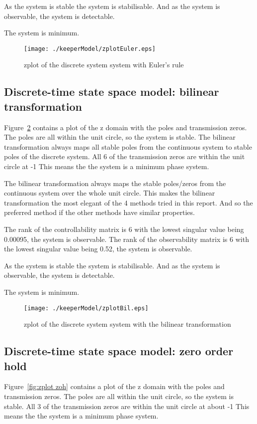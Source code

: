 As the system is stable  the system is stabilisable. And as the system is observable, the system is detectable.

The system is minimum.


\begin{figure}[H]
	\centering
	\texttt{[image: ./keeperModel/zplotEuler.eps]}
	\caption{zplot of the discrete system system with Euler's rule}
	\label{fig:zplot euler}
\end{figure}

\subsection{Discrete-time state space model: bilinear transformation}
Figure~\ref{fig:zplot bil} contains a plot of the z domain with the poles and transmission zeros. The poles are all within the unit circle, so the system is stable. The bilinear  transformation always maps all stable poles from the continuous system to stable poles of the discrete system. All 6 of the transmission zeros are within the unit circle at -1 This means the the system is a minimum phase system.

The bilinear transformation always maps the stable poles/zeros from the continuous system over the whole unit circle. This makes the bilinear transformation the most elegant of the 4 methods tried in this report. And so the preferred method if the other methods have similar properties.

The rank of the controllability matrix is 6 with the lowest singular value being 0.00095, the system is observable. The rank of the observability matrix is 6 with the lowest singular value being 0.52, the system is observable.

As the system is stable  the system is stabilisable. And as the system is observable, the system is detectable.

The system is minimum.

\begin{figure}[H]
	\centering
	\texttt{[image: ./keeperModel/zplotBil.eps]}
	\caption{zplot of the discrete system system with the bilinear transformation}
	\label{fig:zplot bil}
\end{figure}

\subsection{Discrete-time state space model: zero order hold}
Figure~\ref{fig:zplot zoh} contains a plot of the z domain with the poles and transmission zeros. The poles are all within the unit circle, so the system is stable. All 3 of the transmission zeros are within the unit circle at about -1 This means the the system is a minimum phase system.


